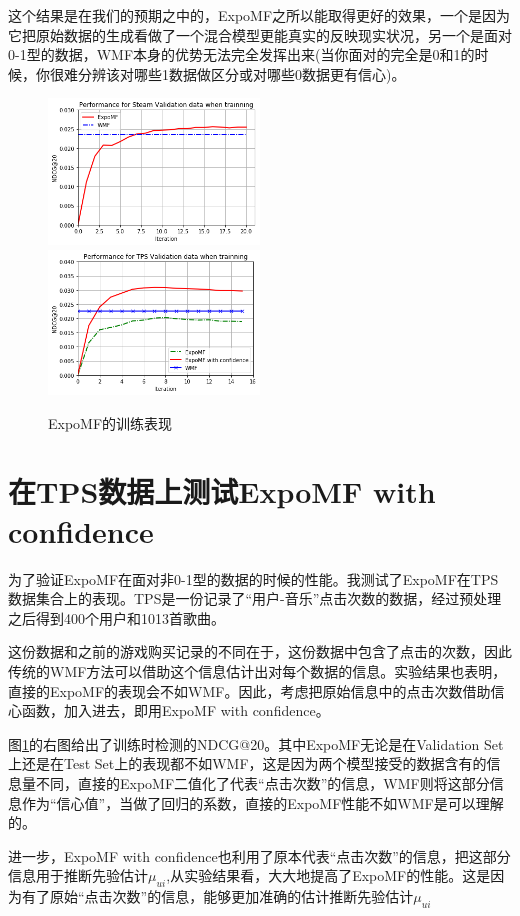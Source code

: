 \documentclass[notitlepage,cs4size,punct,oneside]{ctexrep}
\numberwithin{equation}{chapter}
\theoremstyle{mystyle}
\begin{document}
\par
这个结果是在我们的预期之中的，ExpoMF之所以能取得更好的效果，一个是因为它把原始数据的生成看做了一个混合模型更能真实的反映现实状况，另一个是面对0-1型的数据，WMF本身的优势无法完全发挥出来(当你面对的完全是0和1的时候，你很难分辨该对哪些1数据做区分或对哪些0数据更有信心)。



\begin{figure}[t]
 \includegraphics[width=0.5\textwidth]{./results/performance_steam.png}
 \includegraphics[width=0.5\textwidth]{./results/performance_tps.png}
 \caption{ExpoMF的训练表现}
 \label{figure:performance}
\end{figure}

\section{在TPS数据上测试ExpoMF with confidence}

为了验证ExpoMF在面对非0-1型的数据的时候的性能。我测试了ExpoMF在TPS数据集合上的表现。TPS是一份记录了“用户-音乐”点击次数的数据，经过预处理之后得到400个用户和1013首歌曲。
\par
这份数据和之前的游戏购买记录的不同在于，这份数据中包含了点击的次数，因此传统的WMF方法可以借助这个信息估计出对每个数据的信息。实验结果也表明，直接的ExpoMF的表现会不如WMF。因此，考虑把原始信息中的点击次数借助信心函数，加入进去，即用ExpoMF with confidence。

图\ref{figure:performance}的右图给出了训练时检测的NDCG@20。其中ExpoMF无论是在Validation Set上还是在Test Set上的表现都不如WMF，这是因为两个模型接受的数据含有的信息量不同，直接的ExpoMF二值化了代表“点击次数”的信息，WMF则将这部分信息作为“信心值”，当做了回归的系数，直接的ExpoMF性能不如WMF是可以理解的。
\par
\par
进一步，ExpoMF with confidence也利用了原本代表“点击次数”的信息，把这部分信息用于推断先验估计$\mu_{ui}$,从实验结果看，大大地提高了ExpoMF的性能。这是因为有了原始“点击次数”的信息，能够更加准确的估计推断先验估计$\mu_{ui}$
\end{document}
